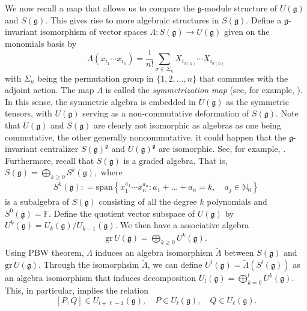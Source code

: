\documentclass[10pt]{amsart}
\theoremstyle{definition}
\theoremstyle{corollary}
\theoremstyle{remark}
\theoremstyle{conclusion}
\begin{document}
We now recall a map that allows us to compare the $\mathfrak{g}$-module structure of $U(\mathfrak{g})$ and $S(\mathfrak{g}).$ This gives rise to more algebraic structures in $S(\mathfrak{g}).$ Define a $\mathfrak{g}$-invariant isomorphism of vector spaces $\Lambda: S(\mathfrak{g}) \rightarrow U(\mathfrak{g})$ given on the monomials basis by   \begin{equation}
 	\Lambda\left(x_{i_1} \cdots x_{i_n}\right) =\frac{1}{n!} \sum_{\sigma \in \Sigma_n}X_{i_{\sigma(1)}} \cdots X_{i_{\sigma(n)}} 
 	\label{symma}
 \end{equation}
with $\Sigma_n$ being the permutation group in $\{1, 2, \dots, n\}$ that commutes with the adjoint action. The map $\Lambda$ is called the \textit{symmetrization map}  (see, for example, \cite{gtp}). In this sense, the symmetric algebra is embedded in $U(\mathfrak{g})$ as the symmetric tensors, with $U(\mathfrak{g})$ serving as a non-commutative deformation of $S(\mathfrak{g}).$ Note that $U(\mathfrak{g})$ and $S(\mathfrak{g})$ are clearly not isomorphic as algebras as one being commutative, the other generally noncommutative, it could happen that the $\mathfrak{g}$-invariant centralizer $S(\mathfrak{g})^\mathfrak{g}$ and $ U(\mathfrak{g})^\mathfrak{g}$ are isomorphic. See, for example, \cite{MR2816610}. Furthermore, recall that $S(\mathfrak{g})$ is a graded algebra. That is, $S(\mathfrak{g})  = \bigoplus_{k \geq 0} S^k (\mathfrak{g}),$ where \begin{align*}
     S^k(\mathfrak{g}) : = \mathrm{span} \left\{x_1^{a_1} \cdots x_n^{a_n}: a_1 + \ldots + a_n = k, \quad a_j \in \mathbb{N}_0\right\} 
 \end{align*} is a subalgebra of $S(\mathfrak{g})$ consisting of all the degree $k$ polynomials and $S^0(\mathfrak{g}) = \mathbb{F}$. Define the quotient vector subspace of $U(\mathfrak{g})$ by $U^k(\mathfrak{g}) = U_k(\mathfrak{g})/U_{k-1}(\mathfrak{g})$. We then have a associative algebra \begin{align}
     \mathrm{gr} \, U(\mathfrak{g}) = \bigoplus_{k \geq 0} U^k(\mathfrak{g}).
 \end{align} Using PBW theorem, $\Lambda$ induces an algebra isomorphism $\tilde{\Lambda}$ between $S(\mathfrak{g})$ and $\mathrm{gr} \, U(\mathfrak{g})$.  Through the isomorphsim $\tilde{\Lambda}$, we can define $U^l(\mathfrak{g})=\tilde{\Lambda}\left(S^l(\mathfrak{g})\right)$ as an algebra isomorphism that induces decomposition $U_{l}(\mathfrak{g})=\bigoplus_{k=0}^{l} U^{k}(\mathfrak{g})$. This, in particular, implies the relation 
\begin{equation*}
	\left[ P,Q\right]\in U_{l+\ell-1}(\mathfrak{g}),\quad P\in U_{l}(\mathfrak{g}), \quad Q\in U_{\ell}(\mathfrak{g}).
\end{equation*}
\end{document}

